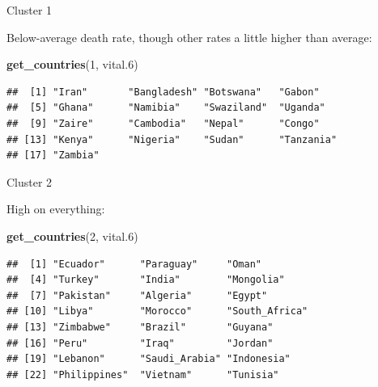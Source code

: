 \documentclass[
  ignorenonframetext,
]{beamer}
\newenvironment{Shaded}{\begin{snugshade}}{\end{snugshade}}
\newcommand{\DecValTok}[1]{\textcolor[rgb]{0.00,0.00,0.81}{#1}}
\newcommand{\FloatTok}[1]{\textcolor[rgb]{0.00,0.00,0.81}{#1}}
\newcommand{\KeywordTok}[1]{\textcolor[rgb]{0.13,0.29,0.53}{\textbf{#1}}}
\newcommand{\NormalTok}[1]{#1}
\begin{document}
\begin{frame}[fragile]{Cluster 1}
\protect\hypertarget{cluster-1-1}{}

Below-average death rate, though other rates a little higher than
average:

\begin{Shaded}
\begin{Highlighting}[]
\KeywordTok{get_countries}\NormalTok{(}\DecValTok{1}\NormalTok{, vital}\FloatTok{.6}\NormalTok{)}
\end{Highlighting}
\end{Shaded}

\begin{verbatim}
##  [1] "Iran"       "Bangladesh" "Botswana"   "Gabon"     
##  [5] "Ghana"      "Namibia"    "Swaziland"  "Uganda"    
##  [9] "Zaire"      "Cambodia"   "Nepal"      "Congo"     
## [13] "Kenya"      "Nigeria"    "Sudan"      "Tanzania"  
## [17] "Zambia"
\end{verbatim}

\end{frame}

\begin{frame}[fragile]{Cluster 2}
\protect\hypertarget{cluster-2}{}

High on everything:

\normalsize

\begin{Shaded}
\begin{Highlighting}[]
\KeywordTok{get_countries}\NormalTok{(}\DecValTok{2}\NormalTok{, vital}\FloatTok{.6}\NormalTok{)}
\end{Highlighting}
\end{Shaded}

\begin{verbatim}
##  [1] "Ecuador"      "Paraguay"     "Oman"        
##  [4] "Turkey"       "India"        "Mongolia"    
##  [7] "Pakistan"     "Algeria"      "Egypt"       
## [10] "Libya"        "Morocco"      "South_Africa"
## [13] "Zimbabwe"     "Brazil"       "Guyana"      
## [16] "Peru"         "Iraq"         "Jordan"      
## [19] "Lebanon"      "Saudi_Arabia" "Indonesia"   
## [22] "Philippines"  "Vietnam"      "Tunisia"
\end{verbatim}

\normalsize

\end{frame}
\end{document}
